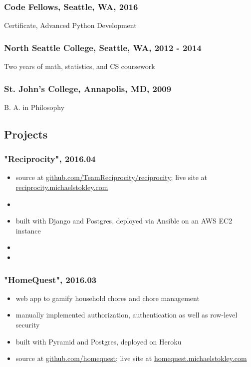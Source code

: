 \documentclass[a4paper, 10pt, oneside, hidelinks]{article}
\begin{document}
\subsubsection*{Code Fellows, Seattle, WA, 2016}
\label{sec:orgheadline5}
Certificate, Advanced Python Development
\subsubsection*{North Seattle College, Seattle, WA, 2012 - 2014}
\label{sec:orgheadline6}
Two years of math, statistics, and CS coursework
\subsubsection*{St. John's College, Annapolis, MD, 2009}
\label{sec:orgheadline7}
B. A. in Philosophy
\subsection*{Projects}
\label{sec:orgheadline12}
\subsubsection*{"Reciprocity", 2016.04}
\label{sec:orgheadline9}
\begin{itemize}
\item source at \href{http://github.com/TeamReciprocity/reciprocity}{github.com/TeamReciprocity/reciprocity}; live site at \href{http://reciprocity.michaelstokley.com}{reciprocity.michaelstokley.com}
\item < one-line description >
\item built with Django and Postgres, deployed via Ansible on an AWS EC2 instance
\item < responsibilities and accomplishments >
\item < highlight the portions of specifically owned >
\end{itemize}
\subsubsection*{"HomeQuest", 2016.03}
\label{sec:orgheadline10}
\begin{itemize}
\item web app to gamify household chores and chore management
\item manually implemented authorization, authentication as well as row-level security
\item built with Pyramid and Postgres, deployed on Heroku
\item source at \href{http://github.com/homequest}{github.com/homequest}; live site at \href{http://homequest.michaelstokley.com}{homequest.michaelstokley.com}
\end{itemize}
\end{document}
